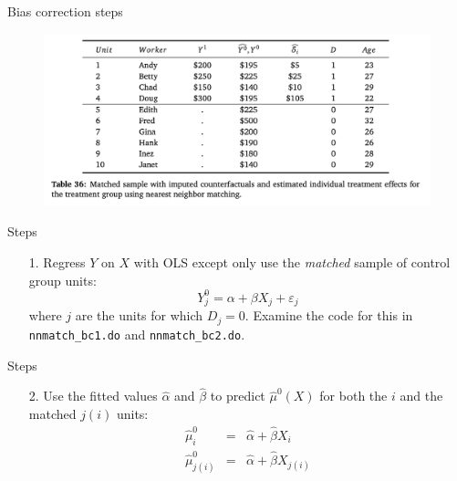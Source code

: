 \documentclass{beamer}
\begin{document}
\begin{frame}{Bias correction steps}

\begin{figure}[!t]\centering
\includegraphics[scale=0.35]{./lecture_includes/nnmatch_bc2}
\end{figure}

\end{frame}


\begin{frame}{Steps}

\begin{enumerate}
\item[1.  ]Regress $Y$ on $X$ with OLS except only use the \emph{matched} sample of control group units:
\begin{equation}
Y^0_j = \alpha + \beta X_j + \varepsilon_j \nonumber
\end{equation}where $j$ are the units for which $D_j=0$.  Examine the code for this in \texttt{nnmatch_bc1.do} and \texttt{nnmatch_bc2.do}.
\end{enumerate}

\end{frame}

\begin{frame}{Steps}

\begin{enumerate}
\item[2. ] Use the fitted values $\widehat{\alpha}$ and $\widehat{\beta}$ to predict $\widehat{\mu}^0(X)$ for both the $i$ and the matched $j(i)$ units:
\begin{eqnarray}
\widehat{\mu}^0_i &=& \widehat{\alpha} + \widehat{\beta} X_i \nonumber \\
\widehat{\mu}^0_{j(i)} &=& \widehat{\alpha} + \widehat{\beta} X_{j(i)} \nonumber
\end{eqnarray}
\end{enumerate}

\end{frame}
\end{document}

